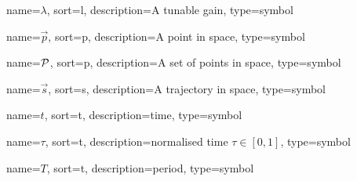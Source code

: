 	{%
		name={\ensuremath{\lambda}},
		sort=l,
		description=A tunable gain,
		type=symbol
	}
	\newcommand{\gain}{\gls{sym:gain}}

	{%
		name={\ensuremath{\vec{p}}},
		sort=p,
		description=A point in space,
		type=symbol
	}
	\newcommand{\point}{\gls{sym:point}}

	{%
		name={\ensuremath{\set{P}}},
		sort=p,
		description=A set of points in space,
		type=symbol
	}
	\newcommand{\setofpoints}{\gls{sym:setofpoints}}

	{%
		name={\ensuremath{\vec{s}}},
		sort=s,
		description=A trajectory in space,
		type=symbol
	}
	\newcommand{\traj}{\gls{sym:traj}}


	{%
		name={\ensuremath{t}},
		sort=t,
		description=time,
		type=symbol
	}
	\newcommand{\timesym}{\gls{sym:time}}

	{%
		name={\ensuremath{\tau}},
		sort=t,
		description=normalised time \ensuremath{\tau \in [0, 1]},
		type=symbol
	}
	\newcommand{\timenorm}{\gls{sym:timenorm}}

	{%
		name={\ensuremath{T}},
		sort=t,
		description=period,
		type=symbol
	}
	\newcommand{\period}{\gls{sym:period}}


